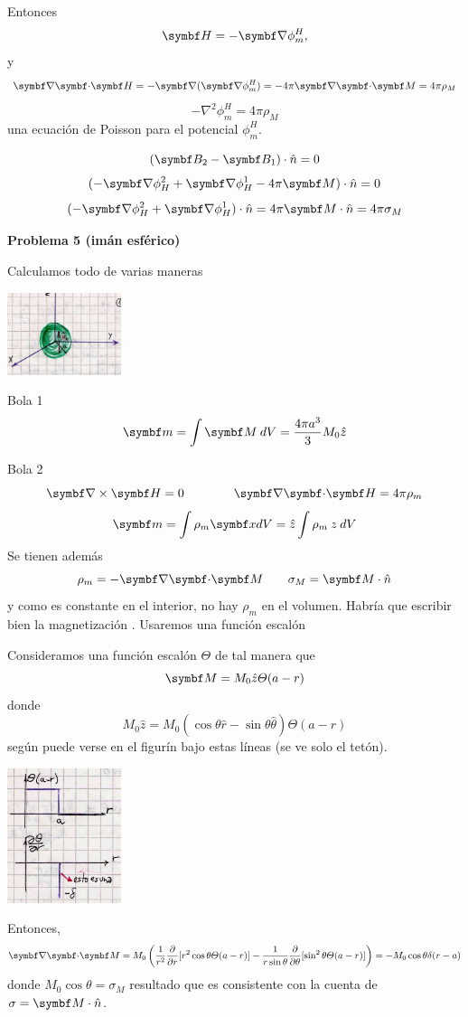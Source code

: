 \documentclass[10pt,oneside]{CBFT_book}
\begin{document}
Entonces
\[
	\vb{H} = -\Nabla \phi_m^H,
\]
y
\[
	\divem{H} = -\Nabla(\Nabla \phi^H_m ) = -4\pi \divem{M} = 4\pi\rho_M
\]
\[
	-\nabla^2 \phi_m^H = 4\pi\rho_M
\]
una ecuación de Poisson para el potencial $\phi_m^H$.

\[
	(\vb{B}_2 - \vb{B}_1)\cdot\hat{n} = 0
\]
\[
	(-\Nabla \phi^2_H + \Nabla \phi^1_H - 4\pi \vb{M})\cdot\hat{n} = 0
\]
\[
	(-\Nabla \phi^2_H + \Nabla \phi^1_H )\cdot\hat{n} = 4\pi \vb{M}\cdot\hat{n} = 4\pi \sigma_M
\]

\begin{ejemplo}{\bf Problema 5 (imán esférico)}

Calculamos todo de varias maneras

\includegraphics[width=0.25\textwidth]{images/fig_ft1_imanesferico_A.jpg}

Bola \textcircled{1}
\[
	\vb{m} = \int \vb{M} \: dV = \frac{4 \pi a^3 }{3} M_0 \hat{z}
\]

Bola \textcircled{2}
\[
	\rotorm{H} = 0 \qquad \qquad \divem{H} = 4 \pi \rho_m
\]
\[
	\vb{m} = \int \rho_m \vbx dV = \hat{z} \int \rho_m \: z \: dV
\]
Se tienen además
\[
	\rho_m = - \divem{M} \qquad \sigma_M = \vb{M}\cdot{\hat{n}}
\]
y como  es constante en el interior, no hay $\rho_m$ en el volumen.
Habría que escribir bien la magnetización .
Usaremos una función escalón

Consideramos una función escalón $ \Theta $ de tal manera que 
\[
	\vb{M} = M_0 \hat{z} \Theta(a-r)
\]
donde 
\[
	M_0 \hat{z} = M_0 ( \cos\theta \hat{r} - \sin\theta \hat{\theta} ) \Theta(a-r)
\]
según puede verse en el figurín bajo estas líneas (se ve solo el tetón).

\includegraphics[width=0.25\textwidth]{images/fig_ft1_imanesferico_B.jpg}

Entonces,
\[
	\divem{M} = M_0 \left( 
	 \frac{1}{r^2}\dpar{}{r}[ r^2 \cos\theta \Theta(a-r) ] -
	 \frac{1}{r\sin\theta}\dpar{}{\theta}[ \sin^2\theta \Theta(a-r) ]
	\right) = - M_0 \cos\theta \delta(r-a)
\]
donde $ M_0 \cos\theta = \sigma_M $ resultado que es consistente con la cuenta de
$\sigma = \vb{M}\cdot\hat{n}$.


\end{ejemplo}
\end{document}
